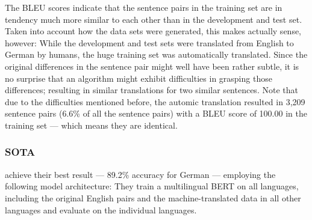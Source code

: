 










The BLEU scores indicate that the sentence pairs in the training set are in tendency much
more similar to each other than in the development and test set. Taken into account how
the data sets were generated, this makes actually sense, however: While the development
and test sets were translated from English to German by humans, the huge training set was
automatically translated. Since the original differences in the sentence pair might well
have been rather subtle, it is no surprise that an algorithm might exhibit difficulties in
grasping those differences; resulting in similar translations for two similar sentences.
Note that due to the difficulties mentioned before, the automic translation resulted in
3,209 sentence pairs (6.6\% of all the sentence pairs) with a BLEU score of 100.00 in the
training set --- which means they are identical.


\subsubsection{SOTA}

\cite{yang2019paws} achieve their best result --- 89.2\% accuracy for German --- employing the
following model architecture:
They train a multilingual BERT on all languages, including the original English pairs and the
machine-translated data in all other languages and evaluate on the individual languages.




